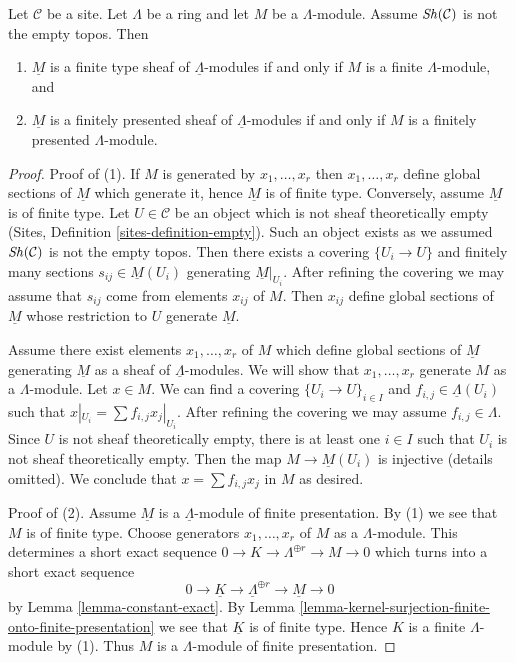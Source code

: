 \begin{lemma}
\label{lemma-locally-constant-finite-type}
Let $\mathcal{C}$ be a site. Let $\Lambda$ be a ring and let $M$ be a
$\Lambda$-module. Assume $\mathop{\mathit{Sh}}\nolimits(\mathcal{C})$ is not the empty topos. Then
\begin{enumerate}
\item $\underline{M}$ is a finite type sheaf of $\underline{\Lambda}$-modules
if and only if $M$ is a finite $\Lambda$-module, and
\item $\underline{M}$ is a finitely presented sheaf of
$\underline{\Lambda}$-modules if and only if $M$ is a 
finitely presented $\Lambda$-module.
\end{enumerate}
\end{lemma}

\begin{proof}
Proof of (1). If $M$ is generated by $x_1, \ldots, x_r$ then
$x_1, \ldots, x_r$ define global sections of $\underline{M}$ which
generate it, hence $\underline{M}$ is of finite type. Conversely, assume
$\underline{M}$ is of finite type. Let $U \in \mathcal{C}$ be an object
which is not sheaf theoretically empty
(Sites, Definition \ref{sites-definition-empty}).
Such an object exists as we assumed $\mathop{\mathit{Sh}}\nolimits(\mathcal{C})$ is not
the empty topos. Then there exists a covering $\{U_i \to U\}$
and finitely many sections $s_{ij} \in \underline{M}(U_i)$ generating
$\underline{M}|_{U_i}$. After refining the covering we may assume
that $s_{ij}$ come from elements $x_{ij}$ of $M$. Then
$x_{ij}$ define global sections of $\underline{M}$ whose restriction
to $U$ generate $\underline{M}$.

\medskip\noindent
Assume there exist elements $x_1, \ldots, x_r$ of $M$ which define
global sections of $\underline{M}$ generating $\underline{M}$
as a sheaf of $\underline{\Lambda}$-modules. We will show that
$x_1, \ldots, x_r$ generate $M$ as a $\Lambda$-module.
Let $x \in M$. We can find a covering $\{U_i \to U\}_{i \in I}$
and $f_{i, j} \in \underline{\Lambda}(U_i)$ such that
$x|_{U_i} = \sum f_{i, j} x_j|_{U_i}$. After refining the covering
we may assume $f_{i, j} \in \Lambda$. Since $U$ is not
sheaf theoretically empty, there is at least one $i \in I$
such that $U_i$ is not sheaf theoretically empty.
Then the map $M \to \underline{M}(U_i)$ is injective (details omitted).
We conclude that $x = \sum f_{i, j}x_j$ in $M$ as desired.

\medskip\noindent
Proof of (2). Assume $\underline{M}$ is a $\underline{\Lambda}$-module
of finite presentation. By (1) we see that $M$ is of finite type.
Choose generators $x_1, \ldots, x_r$ of $M$ as a $\Lambda$-module.
This determines a short exact sequence
$0 \to K \to \Lambda^{\oplus r} \to M \to 0$ which
turns into a short exact sequence
$$
0 \to \underline{K} \to \underline{\Lambda}^{\oplus r} \to \underline{M} \to 0
$$
by Lemma \ref{lemma-constant-exact}. By
Lemma \ref{lemma-kernel-surjection-finite-onto-finite-presentation}
we see that $\underline{K}$ is of finite type. Hence $K$ is a
finite $\Lambda$-module by (1). Thus $M$ is a $\Lambda$-module
of finite presentation.
\end{proof}




